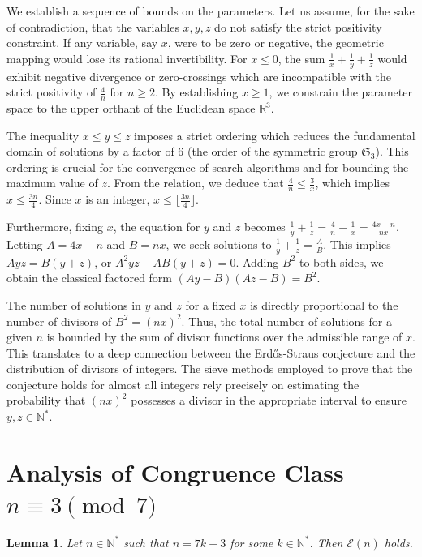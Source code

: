 \documentclass[12pt, a4paper]{article}
\newtheorem{lemma}[theorem]{Lemma}
\theoremstyle{definition}
\theoremstyle{remark}
\begin{document}
We establish a sequence of bounds on the parameters. Let us assume, for the sake of contradiction, that the variables $x, y, z$ do not satisfy the strict positivity constraint. If any variable, say $x$, were to be zero or negative, the geometric mapping would lose its rational invertibility. For $x \le 0$, the sum $\frac{1}{x} + \frac{1}{y} + \frac{1}{z}$ would exhibit negative divergence or zero-crossings which are incompatible with the strict positivity of $\frac{4}{n}$ for $n \ge 2$. By establishing $x \ge 1$, we constrain the parameter space to the upper orthant of the Euclidean space $\mathbb{R}^3$.

The inequality $x \le y \le z$ imposes a strict ordering which reduces the fundamental domain of solutions by a factor of 6 (the order of the symmetric group $\mathfrak{S}_3$). This ordering is crucial for the convergence of search algorithms and for bounding the maximum value of $z$. From the relation, we deduce that $\frac{4}{n} \le \frac{3}{x}$, which implies $x \le \frac{3n}{4}$. Since $x$ is an integer, $x \le \lfloor \frac{3n}{4} \rfloor$.

Furthermore, fixing $x$, the equation for $y$ and $z$ becomes $\frac{1}{y} + \frac{1}{z} = \frac{4}{n} - \frac{1}{x} = \frac{4x - n}{nx}$. Letting $A = 4x - n$ and $B = nx$, we seek solutions to $\frac{1}{y} + \frac{1}{z} = \frac{A}{B}$. This implies $Ayz = B(y+z)$, or $A^2 y z - AB(y+z) = 0$. Adding $B^2$ to both sides, we obtain the classical factored form $(Ay - B)(Az - B) = B^2$.

The number of solutions in $y$ and $z$ for a fixed $x$ is directly proportional to the number of divisors of $B^2 = (nx)^2$. Thus, the total number of solutions for a given $n$ is bounded by the sum of divisor functions over the admissible range of $x$. This translates to a deep connection between the Erd\H{o}s-Straus conjecture and the distribution of divisors of integers. The sieve methods employed to prove that the conjecture holds for almost all integers rely precisely on estimating the probability that $(nx)^2$ possesses a divisor in the appropriate interval to ensure $y, z \in \mathbb{N}^*$.

\section{Analysis of Congruence Class $n \equiv 3 \pmod 7$}

\begin{lemma}
Let $n \in \mathbb{N}^*$ such that $n = 7k + 3$ for some $k \in \mathbb{N}^*$. Then $\mathcal{E}(n)$ holds.
\end{lemma}
\end{document}
